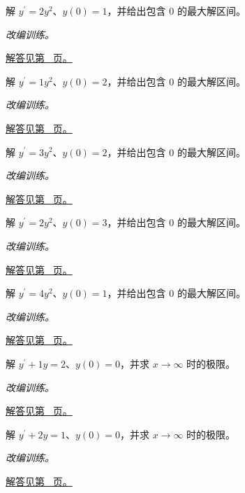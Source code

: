 \documentclass[UTF8,12pt,a4paper,fontset=fandol]{ctexart}
\begin{document}
\begin{example}[分离变量与有限时刻发散]\label{ex:c22q8}
解 $y^{\prime}=2y^2$、$y(0)=1$，并给出包含 $0$ 的最大解区间。
\par\textit{改编训练。}\par\hyperref[ans:c22q8]{解答见第~\pageref{ans:c22q8} 页。}
\end{example}
\begin{example}[分离变量与有限时刻发散]\label{ex:c22q9}
解 $y^{\prime}=1y^2$、$y(0)=2$，并给出包含 $0$ 的最大解区间。
\par\textit{改编训练。}\par\hyperref[ans:c22q9]{解答见第~\pageref{ans:c22q9} 页。}
\end{example}
\begin{example}[分离变量与有限时刻发散]\label{ex:c22q10}
解 $y^{\prime}=3y^2$、$y(0)=2$，并给出包含 $0$ 的最大解区间。
\par\textit{改编训练。}\par\hyperref[ans:c22q10]{解答见第~\pageref{ans:c22q10} 页。}
\end{example}
\begin{example}[分离变量与有限时刻发散]\label{ex:c22q11}
解 $y^{\prime}=2y^2$、$y(0)=3$，并给出包含 $0$ 的最大解区间。
\par\textit{改编训练。}\par\hyperref[ans:c22q11]{解答见第~\pageref{ans:c22q11} 页。}
\end{example}
\begin{example}[分离变量与有限时刻发散]\label{ex:c22q12}
解 $y^{\prime}=4y^2$、$y(0)=1$，并给出包含 $0$ 的最大解区间。
\par\textit{改编训练。}\par\hyperref[ans:c22q12]{解答见第~\pageref{ans:c22q12} 页。}
\end{example}
\begin{example}[积分因子解线性方程]\label{ex:c22q13}
解 $y^{\prime}+1y=2$、$y(0)=0$，并求 $x\to\infty$ 时的极限。
\par\textit{改编训练。}\par\hyperref[ans:c22q13]{解答见第~\pageref{ans:c22q13} 页。}
\end{example}
\begin{example}[积分因子解线性方程]\label{ex:c22q14}
解 $y^{\prime}+2y=1$、$y(0)=0$，并求 $x\to\infty$ 时的极限。
\par\textit{改编训练。}\par\hyperref[ans:c22q14]{解答见第~\pageref{ans:c22q14} 页。}
\end{example}
\end{document}
